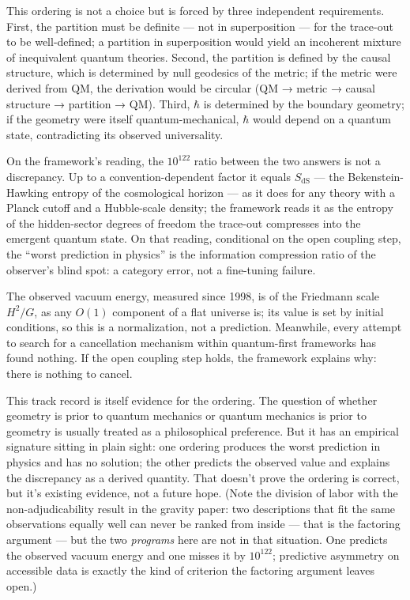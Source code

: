 \documentclass[
]{article}
\begin{document}
This ordering is not a choice but is forced by three independent
requirements. First, the partition must be definite --- not in
superposition --- for the trace-out to be well-defined; a partition in
superposition would yield an incoherent mixture of inequivalent quantum
theories. Second, the partition is defined by the causal structure,
which is determined by null geodesics of the metric; if the metric were
derived from QM, the derivation would be circular (QM → metric → causal
structure → partition → QM). Third, \(\hbar\) is determined by the
boundary geometry; if the geometry were itself quantum-mechanical,
\(\hbar\) would depend on a quantum state, contradicting its observed
universality.

On the framework's reading, the \(10^{122}\) ratio between the two
answers is not a discrepancy. Up to a convention-dependent factor it
equals \(S_{\text{dS}}\) --- the Bekenstein-Hawking entropy of the
cosmological horizon --- as it does for any theory with a Planck cutoff
and a Hubble-scale density; the framework reads it as the entropy of the
hidden-sector degrees of freedom the trace-out compresses into the
emergent quantum state. On that reading, conditional on the open
coupling step, the ``worst prediction in physics'' is the information
compression ratio of the observer's blind spot: a category error, not a
fine-tuning failure.

The observed vacuum energy, measured since 1998, is of the Friedmann
scale \(H^2/G\), as any \(O(1)\) component of a flat universe is; its
value is set by initial conditions, so this is a normalization, not a
prediction. Meanwhile, every attempt to search for a cancellation
mechanism within quantum-first frameworks has found nothing. If the open
coupling step holds, the framework explains why: there is nothing to
cancel.

This track record is itself evidence for the ordering. The question of
whether geometry is prior to quantum mechanics or quantum mechanics is
prior to geometry is usually treated as a philosophical preference. But
it has an empirical signature sitting in plain sight: one ordering
produces the worst prediction in physics and has no solution; the other
predicts the observed value and explains the discrepancy as a derived
quantity. That doesn't prove the ordering is correct, but it's existing
evidence, not a future hope. (Note the division of labor with the
non-adjudicability result in the gravity paper: two descriptions that
fit the same observations equally well can never be ranked from inside
--- that is the factoring argument --- but the two \emph{programs} here
are not in that situation. One predicts the observed vacuum energy and
one misses it by \(10^{122}\); predictive asymmetry on accessible data
is exactly the kind of criterion the factoring argument leaves open.)
\end{document}
